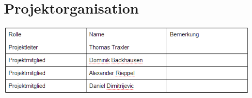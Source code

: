 \documentclass[a4paper,12pt]{scrreprt}
\begin{document}
	
	\section*{Projektorganisation}
	\includegraphics{./Projektorganisation}
		
\end{document}
